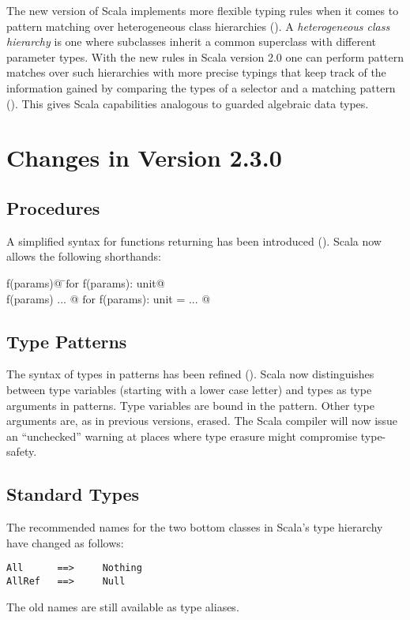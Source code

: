 The new version of Scala implements more flexible typing rules when it
comes to pattern matching over heterogeneous class hierarchies
(). A {\em heterogeneous class hierarchy} is
one where subclasses inherit a common superclass with different
parameter types.  With the new rules in Scala version 2.0 one can
perform pattern matches over such hierarchies with more precise
typings that keep track of the information gained by comparing the
types of a selector and a matching pattern ().
This gives Scala capabilities analogous to guarded algebraic data types.

\section{Changes in Version 2.3.0}

\subsection*{Procedures} A simplified syntax for functions returning
\lstinline@unit@ has been introduced (). 
Scala now allows the following shorthands:

\begin{tabbing}
\lstinline@def f(params)@     \tab\tab\tab \=$\mbox{for}$  \tab
\lstinline@def f(params): unit@ \\
\lstinline@def f(params) { ... }@  \>$\mbox{for}$    \tab
\lstinline@def f(params): unit = { ... }@
\end{tabbing}

\subsection*{Type Patterns} The syntax of types in patterns has been 
refined (). Scala now distinguishes between
type variables (starting with a lower case letter) and types as type
arguments in patterns.  Type variables are bound in the pattern. Other
type arguments are, as in previous versions, erased. The Scala
compiler will now issue an ``unchecked'' warning at places where type
erasure might compromise type-safety.

\subsection*{Standard Types} 

The recommended names for the two bottom classes in Scala's type
hierarchy have changed as follows:
\begin{lstlisting}
All      ==>     Nothing
AllRef   ==>     Null
\end{lstlisting}
The old names are still available as type aliases.

